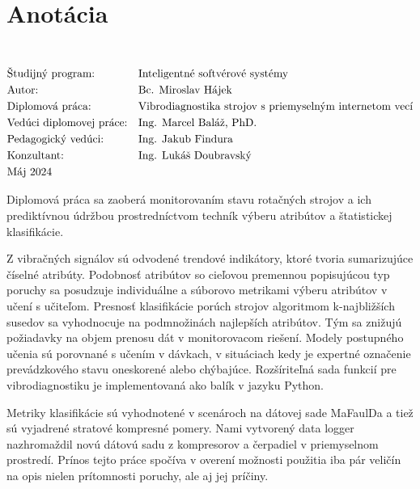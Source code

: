 \section*{Anotácia}
\University \\
\uppercase{\Faculty}
\vspace{-8pt}
{\setlength{\mathindent}{0cm}
\begin{align*}
&\text{Študijný program:} && \text{\StudyProgramme} \\
&\text{Autor:} && \text{\Author} \\
&\text{\Thesis:} && \text{\Title} \\
&\text{Vedúci diplomovej práce:} && \text{\Supervisor} \\
&\text{Pedagogický vedúci:} && \text{\DepartmentalAdvisor} \\
&\text{Konzultant:} && \text{\Consultant} \\
&\text{\Date}
\end{align*}}

Diplomová práca sa zaoberá monitorovaním stavu rotačných strojov a ich prediktívnou údržbou prostredníctvom techník výberu atribútov a štatistickej klasifikácie.

Z vibračných signálov sú odvodené trendové indikátory, ktoré tvoria sumarizujúce číselné atribúty. Podobnosť atribútov so cieľovou premennou popisujúcou typ poruchy sa posudzuje individuálne a súborovo metrikami výberu atribútov v učení s učiteľom.  Presnosť klasifikácie porúch strojov algoritmom k-najbližších susedov sa vyhodnocuje na podmnožinách najlepších atribútov. Tým sa znižujú požiadavky na objem prenosu dát v monitorovacom riešení. Modely postupného učenia sú porovnané s učením v dávkach, v situáciach kedy je expertné označenie prevádzkového stavu oneskorené alebo chýbajúce. Rozšíriteľná sada funkcií pre vibrodiagnostiku je implementovaná ako balík v jazyku Python.

Metriky klasifikácie sú vyhodnotené v scenároch na dátovej sade MaFaulDa a tiež sú vyjadrené stratové kompresné pomery. Nami vytvorený data logger nazhromaždil novú dátovú sadu z kompresorov a čerpadiel v priemyselnom prostredí. Prínos tejto práce spočíva v overení možnosti použitia iba pár veličín na opis nielen prítomnosti poruchy, ale aj jej príčiny.
\emptypage

